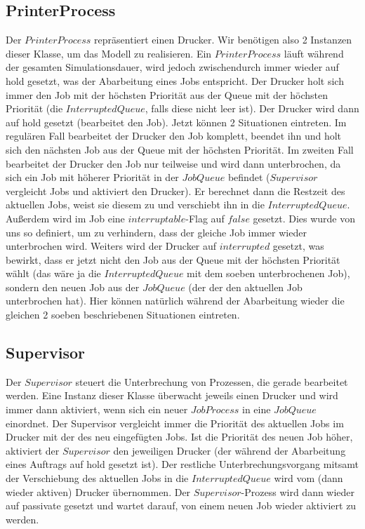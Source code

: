 \documentclass[12pt,a4paper]{article}
\begin{document}
	\subsection{PrinterProcess}
	Der $PrinterProcess$ repräsentiert einen Drucker. Wir benötigen also 2 Instanzen dieser Klasse, um das Modell zu realisieren. Ein $PrinterProcess$ läuft während der gesamten Simulationsdauer, wird
	jedoch zwischendurch immer wieder auf hold gesetzt, was der Abarbeitung eines Jobs entspricht. Der Drucker holt sich immer den Job mit der höchsten Priorität aus der Queue mit der höchsten Priorität (die 
	$InterruptedQueue$, falls diese nicht leer ist). Der Drucker wird dann auf hold gesetzt (bearbeitet den Job). Jetzt können 2 Situationen eintreten. Im regulären Fall bearbeitet der Drucker den Job komplett,
	beendet ihn und holt sich den nächsten Job aus der Queue mit der höchsten Priorität. Im zweiten Fall bearbeitet der Drucker den Job nur teilweise und wird dann unterbrochen, da sich ein Job mit
	höherer Priorität in der $JobQueue$ befindet ($Supervisor$ vergleicht Jobs und aktiviert den Drucker). Er berechnet dann die Restzeit des aktuellen Jobs, weist sie diesem zu und verschiebt ihn in die
	$InterruptedQueue$. Außerdem wird im Job eine $interruptable$-Flag auf $false$ gesetzt. Dies wurde von uns so definiert, um zu verhindern, dass der gleiche Job immer wieder unterbrochen wird. Weiters
	 wird der Drucker auf $interrupted$ gesetzt, was bewirkt, dass er jetzt nicht den Job aus der Queue mit der höchsten Priorität wählt (das wäre ja die $InterruptedQueue$ mit dem soeben unterbrochenen Job),
	 sondern den neuen Job aus der $JobQueue$ (der der den aktuellen Job unterbrochen hat). Hier können natürlich während der Abarbeitung wieder die gleichen 2 soeben beschriebenen Situationen eintreten.
	
	\subsection{Supervisor}
	Der $Supervisor$ steuert die Unterbrechung von Prozessen, die gerade bearbeitet werden. Eine Instanz dieser Klasse überwacht jeweils einen Drucker und wird immer dann aktiviert, wenn sich ein 
	neuer $JobProcess$ in eine $JobQueue$ einordnet. Der Supervisor vergleicht immer die Priorität des aktuellen Jobs im Drucker mit der des neu eingefügten Jobs. Ist die Priorität des neuen Job höher, aktiviert
	der $Supervisor$ den jeweiligen Drucker (der während der Abarbeitung eines Auftrags auf hold gesetzt ist). Der restliche Unterbrechungsvorgang mitsamt der Verschiebung des aktuellen Jobs in die
	$InterruptedQueue$ wird vom (dann wieder aktiven) Drucker übernommen. Der $Supervisor$-Prozess wird dann wieder auf passivate gesetzt und wartet darauf, von einem neuen Job wieder aktiviert zu 
	werden.
	
\end{document}
